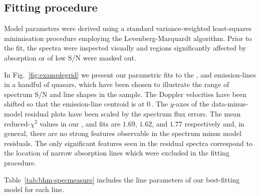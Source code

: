 \subsection{Fitting procedure}

Model parameters were derived using a standard variance-weighted least-squares minimisation procedure employing the Levenberg-Marquardt algorithm. 
Prior to the fit, the spectra were inspected visually and regions significantly affected by absorption or of low S/N were masked out.

In Fig.~\ref{fig:examplegrid} we present our parametric fits to the , \ha and \hb emission-lines in a handful of quasars, which have been chosen to illustrate the range of spectrum S/N and line shapes in the sample.  
The Doppler velocities have been shifted so that the \ha emission-line centroid is at $0$\,\kms. 
The $y$-axes of the data-minus-model residual plots have been scaled by the spectrum flux errors.
The mean reduced-$\chi^2$ values in our \hans, \hb and  fits are $1.69$, $1.62$, and $1.77$ respectively and, in general, there are no strong features observable in the spectrum minus model residuals. 
The only significant features seen in the residual  spectra correspond to the location of narrow absorption lines which were excluded in the fitting procedure.

Table~\ref{tab:bhm-specmeasure} includes the line parameters of our best-fitting model for each line.

